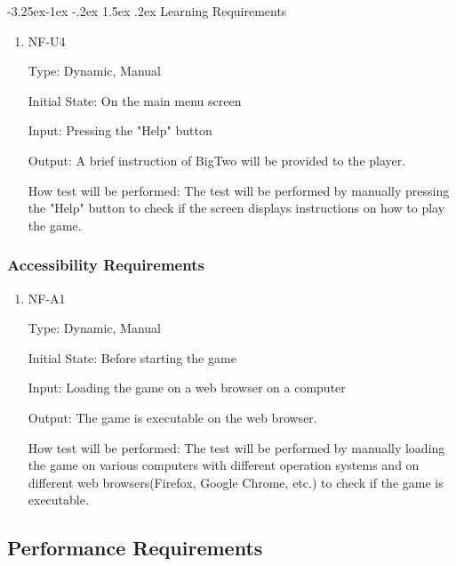 \documentclass[12pt, titlepage]{article}
\makeatletter
\renewcommand\paragraph{\@startsection{paragraph}{4}{\z@}%
                                     {-3.25ex\@plus -1ex \@minus -.2ex}%
                                     {1.5ex \@plus .2ex}%
                                     {\normalfont\normalsize\bfseries}}
\makeatother
\begin{document}
\paragraph{Learning Requirements}
\begin{enumerate}
\item{NF-U4\\}

Type:  Dynamic, Manual
					
Initial State: On the main menu screen
					
Input: Pressing the "Help" button
					
Output: A brief instruction of BigTwo will be provided to the player.
					
How test will be performed: The test will be performed by manually pressing the "Help" button to check if the screen displays instructions on how to play the game. 

\end{enumerate}

\subsubsection{Accessibility Requirements}
\begin{enumerate}
\item{NF-A1\\}

Type:  Dynamic, Manual
					
Initial State: Before starting the game
					
Input: Loading the game on a web browser on a computer
					
Output: The game is executable on the web browser.
					
How test will be performed: The test will be performed by manually loading the game on various computers with different operation systems and on different web browsers(Firefox, Google Chrome, etc.) to check if the game is executable. 

\end{enumerate}

\subsection{Performance Requirements}
\end{document}
